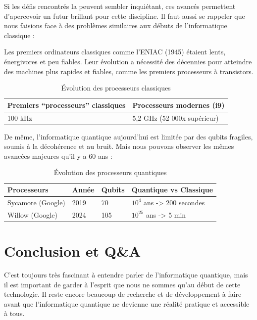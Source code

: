 \documentclass{article}
\begin{document}
Si les défis rencontrés la peuvent sembler inquiétant, ces avancés permettent d'apercevoir un futur brillant pour cette discipline. Il faut aussi se rappeler que nous faisions face à des problèmes similaires aux débuts de l’informatique classique :  

Les premiers ordinateurs classiques comme l'ENIAC (1945) étaient lents, énergivores et peu fiables. Leur évolution a nécessité des décennies pour atteindre des machines plus rapides et fiables, comme les premiers processeurs à transistors. 

\begin{table}[H]
\centering
\begin{tabular}{|l|l|}
  \hline
  \textbf{Premiers “processeurs” classiques} & \textbf{Processeurs modernes (i9)} \\
  \hline
  100 kHz & 5,2 GHz (52 000x supérieur) \\
  \hline
\end{tabular}
\caption{Évolution des processeurs classiques}
\end{table}

De même, l’informatique quantique aujourd'hui est limitée par des qubits fragiles, soumis à la décohérence et au bruit. Mais nous pouvons observer les mêmes avancées majeures qu’il y a 60 ans : 

\begin{table}[H]
\centering
\begin{tabular}{|l|l|l|l|}
  \hline
  \textbf{Processeurs} & \textbf{Année} & \textbf{Qubits} & \textbf{Quantique vs Classique} \\
  \hline
  Sycamore (Google) & 2019 & 70 & $10^4$ ans -> 200 secondes \\
  Willow (Google) & 2024 & 105 & $10^{25}$ ans -> 5 min \\
  \hline
\end{tabular}
\caption{Évolution des processeurs quantiques}
\end{table}

\cite{googleWillow} \cite{wikipediaSycamore} \cite{wikipediaQProcessors}

\break\section{Conclusion et Q\&A}

C'est toujours très fascinant à entendre parler de l'informatique quantique, mais il est important de garder à l'esprit que nous ne sommes qu'au début de cette technologie. Il reste encore beaucoup de recherche et de développement à faire avant que l'informatique quantique ne devienne une réalité pratique et accessible à tous.
\end{document}
